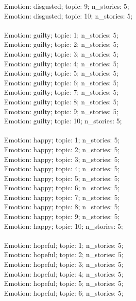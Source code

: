 \begin{anthropicbox}
    Emotion: disgusted; topic: 9; n\_stories: 5;\\
    Emotion: disgusted; topic: 10; n\_stories: 5;
    \\\\
    Emotion: guilty; topic: 1; n\_stories: 5;\\
    Emotion: guilty; topic: 2; n\_stories: 5;\\
    Emotion: guilty; topic: 3; n\_stories: 5;\\
    Emotion: guilty; topic: 4; n\_stories: 5;\\
    Emotion: guilty; topic: 5; n\_stories: 5;\\
    Emotion: guilty; topic: 6; n\_stories: 5;\\
    Emotion: guilty; topic: 7; n\_stories: 5;\\
    Emotion: guilty; topic: 8; n\_stories: 5;\\
    Emotion: guilty; topic: 9; n\_stories: 5;\\
    Emotion: guilty; topic: 10; n\_stories: 5;
    \\\\
    Emotion: happy; topic: 1; n\_stories: 5;\\
    Emotion: happy; topic: 2; n\_stories: 5;\\
    Emotion: happy; topic: 3; n\_stories: 5;\\
    Emotion: happy; topic: 4; n\_stories: 5;\\
    Emotion: happy; topic: 5; n\_stories: 5;\\
    Emotion: happy; topic: 6; n\_stories: 5;\\
    Emotion: happy; topic: 7; n\_stories: 5;\\
    Emotion: happy; topic: 8; n\_stories: 5;\\
    Emotion: happy; topic: 9; n\_stories: 5;\\
    Emotion: happy; topic: 10; n\_stories: 5;
    \\\\
    Emotion: hopeful; topic: 1; n\_stories: 5;\\
    Emotion: hopeful; topic: 2; n\_stories: 5;\\
    Emotion: hopeful; topic: 3; n\_stories: 5;\\
    Emotion: hopeful; topic: 4; n\_stories: 5;\\
    Emotion: hopeful; topic: 5; n\_stories: 5;\\
    Emotion: hopeful; topic: 6; n\_stories: 5;\\

\end{anthropicbox}
